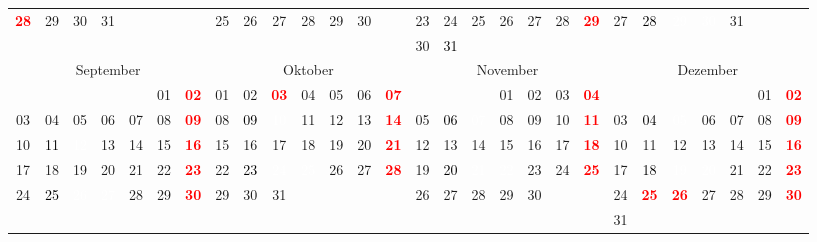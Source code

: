 \documentclass[10pt,a4paper,landscape]{article}
\newcommand{\bb}[1]{\cellcolor{MidnightBlue}\textcolor{white}{#1}}
\newcommand{\yb}[1]{\cellcolor{yellow}\textcolor{black}{#1}}
\newcommand{\ob}[1]{\cellcolor{Orange}\textcolor{white}{#1}}
\newcommand{\rb}[1]{\textbf{\textcolor{red}{#1}}}
\begin{document}
\begin{tabular}{|ccccccc|ccccccc|ccccccc|ccccccc|}
\rb{28} & 29 & 30 & 31 &    &    &    & 25 & 26 & 27 & 28 & 29 & 30 &    & 23 & 24 & 25 & 26 & 27 & 28 & \rb{29} & 27 & \yb{28} & \ob{29} & \bb{30} & 31 &    &    \\
   &    &    &    &    &    &    &    &    &    &    &    &    &    & 30 & \yb{31} &    &    &    &    &    &    &    &    &    &    &    &    \\\hline
\multicolumn{7}{|c|}{September} & \multicolumn{7}{|c|}{Oktober} & \multicolumn{7}{|c|}{November} & \multicolumn{7}{|c|}{Dezember} \\
   &    &    &    &    & 01 & \rb{02} & 01 & 02 & \rb{03} & 04 & 05 & 06 & \rb{07} &    &    &    & 01 & 02 & 03 & \rb{04} &    &    &    &    &    & 01 & \rb{02} \\
03 & 04 & 05 & 06 & 07 & 08 & \rb{09} & 08 & \yb{09} & \ob{10} & 11 & 12 & 13 & \rb{14} & 05 & \yb{06} & \ob{07} & 08 & 09 & 10 & \rb{11} & 03 & \yb{04} & \ob{05} & 06 & 07 & 08 & \rb{09} \\
10 & \yb{11} & \ob{12} & 13 & 14 & 15 & \rb{16} & 15 & 16 & 17 & 18 & 19 & 20 & \rb{21} & 12 & 13 & 14 & 15 & 16 & 17 & \rb{18} & 10 & 11 & 12 & 13 & 14 & 15 & \rb{16} \\
17 & 18 & 19 & 20 & 21 & 22 & \rb{23} & 22 & \yb{23} & \ob{24} & \bb{25} & 26 & 27 & \rb{28} & 19 & \yb{20} & \ob{21} & \bb{22} & 23 & 24 & \rb{25} & 17 & \yb{18} & \ob{19} & \bb{20} & 21 & 22 & \rb{23} \\
24 & \yb{25} & \ob{26} & \bb{27} & 28 & 29 & \rb{30} & 29 & 30 & 31 &    &    &    &    & 26 & 27 & 28 & 29 & 30 &    &    & 24 & \rb{25} & \rb{26} & 27 & 28 & 29 & \rb{30} \\
   &    &    &    &    &    &    &    &    &    &    &    &    &    &    &    &    &    &    &    &    & 31 &    &    &    &    &    &    \\\hline
\end{tabular}
\end{document}
